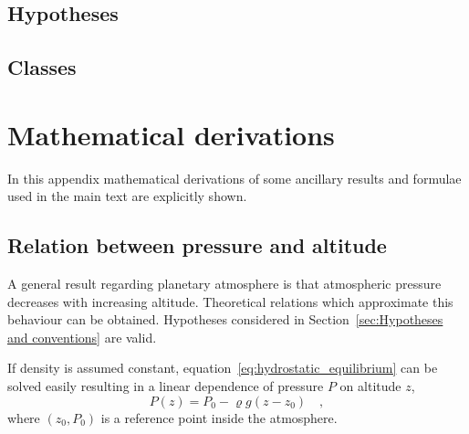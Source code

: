 \documentclass[a4paper,10pt,twocolumn,\classoptions]{article}
\begin{document}
\subsection{Hypotheses} %
\label{sec:Hypotheses}



\subsection{Classes}



\section{Mathematical derivations}
In this appendix mathematical derivations of some ancillary results and formulae used in the main text are explicitly shown.



\subsection{Relation between pressure and altitude}
\label{sec:Relation between pressure and altitude}
A general result regarding planetary atmosphere is that atmospheric pressure decreases with increasing altitude. Theoretical relations which approximate this behaviour can be obtained. Hypotheses considered in Section~\ref{sec:Hypotheses and conventions} are valid.

If density is assumed constant, equation~\eqref{eq:hydrostatic_equilibrium} can be solved easily resulting in a linear dependence of pressure $P$ on altitude $z$, %
\begin{equation}
  \label{eq:pressure_constant_density}
  P(z) = P_0 - \varrho g (z - z_0)
  \quad ,
\end{equation}
where $(z_0, P_0)$ is a reference point inside the atmosphere.
\end{document}
